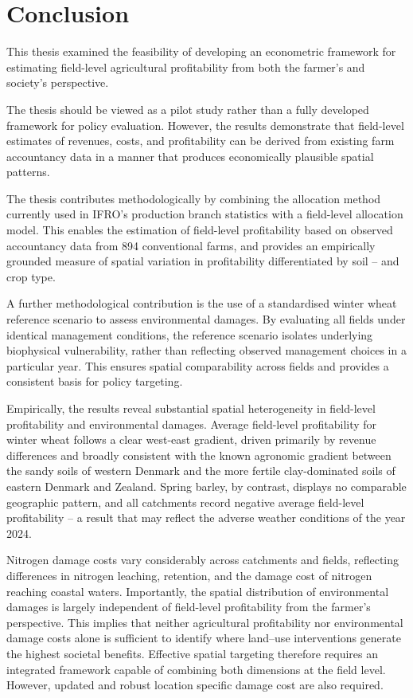 \documentclass[12pt]{article}
\begin{document}
\section{Conclusion}
\label{sec:conclusion}



This thesis examined the feasibility of developing an econometric framework for estimating field-level agricultural profitability from both the farmer's and society's perspective.


The thesis should be viewed as a pilot study rather than a fully developed framework for policy evaluation. However, the results demonstrate that field-level estimates of revenues, costs, and profitability can be derived from existing farm accountancy data in a manner that produces economically plausible spatial patterns.


The thesis contributes methodologically by combining the allocation method currently used in IFRO's production branch statistics with a field-level allocation model.
This enables the estimation of field-level profitability based on observed accountancy data from 894 conventional farms, and provides an empirically grounded measure of spatial variation in profitability differentiated by soil -- and crop type.

A further methodological contribution is the use of a standardised winter wheat reference scenario to assess environmental damages. 
By evaluating all fields under identical management conditions, the reference scenario isolates underlying biophysical vulnerability, rather than reflecting observed management choices in a particular year. 
This ensures spatial comparability across fields and provides a consistent basis for policy targeting.

Empirically, the results reveal substantial spatial heterogeneity in field-level profitability and environmental damages. 
Average field-level profitability for winter wheat follows a clear west-east gradient, driven primarily by revenue differences and broadly consistent with the known agronomic gradient between the sandy soils of western Denmark and the more fertile clay-dominated soils of eastern Denmark and Zealand. 
Spring barley, by contrast, displays no comparable geographic pattern, and all catchments record negative average field-level profitability -- a result that may reflect the adverse weather conditions of the year 2024.


Nitrogen damage costs vary considerably across catchments and fields, reflecting differences in nitrogen leaching, retention, and the damage cost of nitrogen reaching coastal waters.
Importantly, the spatial distribution of environmental damages is largely independent of field-level profitability from the farmer's perspective. 
This implies that neither agricultural profitability nor environmental damage costs alone is sufficient to identify where land--use interventions generate the highest societal benefits. 
Effective spatial targeting therefore requires an integrated framework capable of combining both dimensions at the field level. However, updated and robust location specific damage cost are also required.
\end{document}
